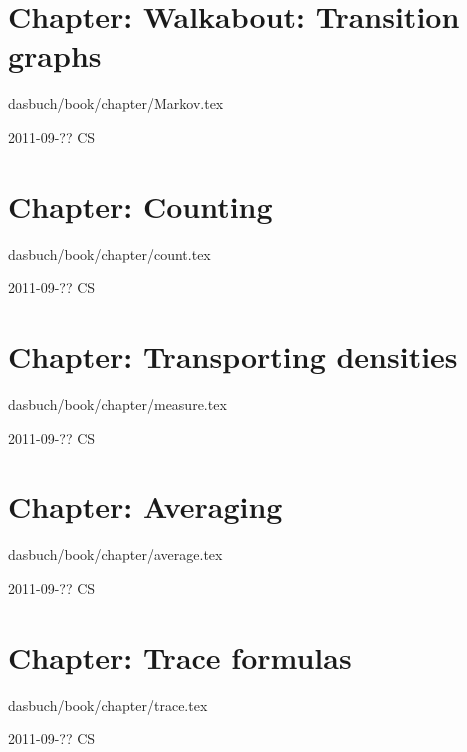 \section{Chapter: Walkabout: Transition graphs}
\label{c-Markov}\noindent dasbuch/book/chapter/Markov.tex
\begin{description}\item[2011-09-?? CS]

\end{description}

\section{Chapter: Counting}
\label{c-count}\noindent dasbuch/book/chapter/count.tex
\begin{description}\item[2011-09-?? CS]

\end{description}

\section{Chapter: Transporting densities}
\label{c-measure}\noindent dasbuch/book/chapter/measure.tex
\begin{description}\item[2011-09-?? CS]

\end{description}

\section{Chapter: Averaging}
\label{c-average}\noindent dasbuch/book/chapter/average.tex
\begin{description}\item[2011-09-?? CS]

\end{description}

\section{Chapter: Trace formulas}
\label{c-trace}\noindent dasbuch/book/chapter/trace.tex
\begin{description}\item[2011-09-?? CS]

\end{description}


